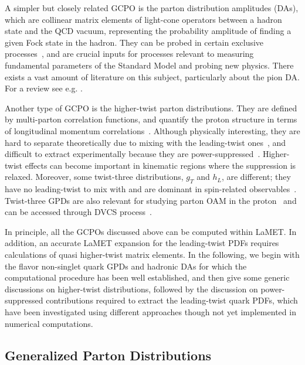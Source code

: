A simpler but closely related GCPO is the parton distribution amplitudes (DAs), which are collinear matrix elements of light-cone operators between a hadron state and the QCD vacuum, representing the probability amplitude of finding a given Fock state in the hadron. They can be probed in certain exclusive processes~\cite{Brodsky:2002st}, and are crucial inputs for processes relevant to measuring fundamental parameters of the Standard Model and probing new physics. There exists a vast amount of literature on this subject, particularly about the pion DA. For a review see e.g. \cite{Brodsky:1989pv,Grozin:2005iz,Braun:2006hn}.

Another type of GCPO is the higher-twist parton distributions.
They are defined by multi-parton correlation functions, and quantify the proton structure
in terms of longitudinal momentum correlations~\cite{Jaffe:1982pm,Ellis:1982cd,Jaffe:1991ra}.
Although physically interesting, they are hard to
separate theoretically due to mixing with the
leading-twist ones~\cite{Mueller:1984vh,Ji:1994md}, and difficult to
extract experimentally because they are power-suppressed~\cite{Ji:1993ey}.
Higher-twist effects can become important in kinematic regions where the
suppression is relaxed. Moreover, some twist-three distributions,
$g_T$ and $h_L$, are different; they have no leading-twist to mix with and are dominant
in spin-related observables~\cite{Jaffe:1991ra}.
Twist-three GPDs are also relevant for studying parton OAM in the
proton~\cite{Hatta:2012cs,Ji:2012ba,Courtoy:2013oaa} and can be
accessed through DVCS process~\cite{Penttinen:2000dg,Kiptily:2002nx}.


In principle, all the GCPOs discussed above can be computed within LaMET.
%
In addition, an accurate LaMET expansion for the leading-twist PDFs requires
calculations of quasi higher-twist matrix elements.
In the following, we begin with the flavor non-singlet quark GPDs and hadronic DAs for which the computational procedure has been well established, and then give some generic discussions on higher-twist distributions, followed by the discussion on power-suppressed contributions required to extract the leading-twist quark PDFs, which have been investigated using different approaches though not yet implemented in numerical computations.


\subsection{Generalized Parton Distributions}
\label{sec:others-gpd}

